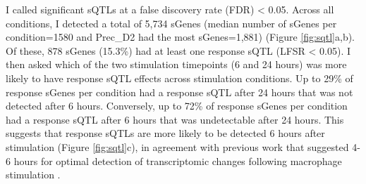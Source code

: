 I called significant sQTLs at a false discovery rate (FDR) < 0.05. Across all conditions, I detected a total of 5,734 sGenes (median number of sGenes per condition=1580 and Prec\_D2 had the most sGenes=1,881) (Figure \ref{fig:sqtl}a,b). Of these, 878 sGenes (15.3\%) had at least one response sQTL (LFSR < 0.05).  I then asked which of the two stimulation timepoints (6 and 24 hours) was more likely to have response sQTL effects across stimulation conditions. Up to 29\% of response sGenes per condition had a response sQTL after 24 hours that was not detected after 6 hours. Conversely, up to 72\% of response sGenes per condition had a response sQTL after 6 hours that was  undetectable after 24 hours. This suggests that response sQTLs are more likely to be detected 6 hours after stimulation (Figure \ref{fig:sqtl}c), in agreement with previous work that suggested 4-6 hours for optimal detection of transcriptomic changes following macrophage stimulation \cite{Unuvar_Purcu2022-zq,Sharif2007-np}. \\

